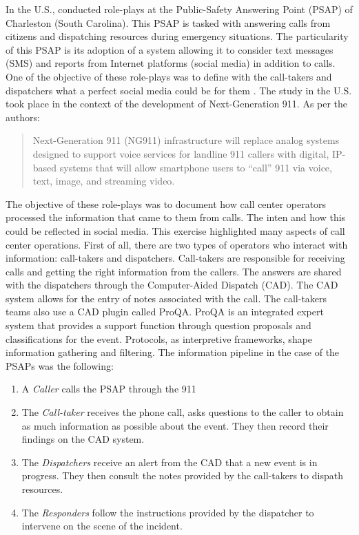 In the U.S., \textcite{graceRolePlayingNext2019} conducted role-plays at the Public-Safety Answering Point (PSAP) of Charleston (South Carolina).
This PSAP is tasked with answering calls from citizens and dispatching resources during emergency situations.
The particularity of this PSAP is its adoption of a system allowing it to consider
text messages (SMS) and reports from Internet platforms (social media) in addition to calls.
One of the objective of these role-plays was to define with the call-takers and dispatchers what a perfect social media could be for them \parencite{kropczynskiIdentifyingActionableInformation2018}.
The study in the U.S. took place in the context of the development of Next-Generation 911.
As per the authors:
\blockquote{Next-Generation 911 (NG911) infrastructure will replace analog systems
    designed to support voice services for landline 911 callers with digital, IP-based systems that
    will allow smartphone users to “call” 911 via voice, text, image, and streaming video.}
The objective of these role-plays was to document how call center operators processed the information that came to them from calls.
The inten and how this could be reflected in social media.
This exercise highlighted many aspects of call center operations.
First of all, there are two types of operators who interact with information: call-takers and dispatchers.
Call-takers are responsible for receiving calls and getting the right information from the callers.
The answers are shared with the dispatchers through the Computer-Aided Dispatch (CAD).
The CAD system allows for the entry of notes associated with the call.
The call-takers teams also use a CAD plugin called ProQA.
ProQA is an integrated expert system that provides a support function through question proposals and classifications for the event.
Protocols, as interpretive frameworks, shape information gathering and filtering.
The information pipeline in the case of the PSAPs was the following:

\begin{enumerate}
    \item A \textit{Caller} calls the PSAP through the 911
    \item The \textit{Call-taker} receives the phone call, asks questions to the caller to obtain as much information as possible about the event.
          They then record their findings on the CAD system.
    \item The \textit{Dispatchers} receive an alert from the CAD that a new event is in progress. They then consult the notes provided by the call-takers to dispath resources.
    \item The \textit{Responders} follow the instructions provided by the dispatcher to intervene on the scene of the incident.
\end{enumerate}

